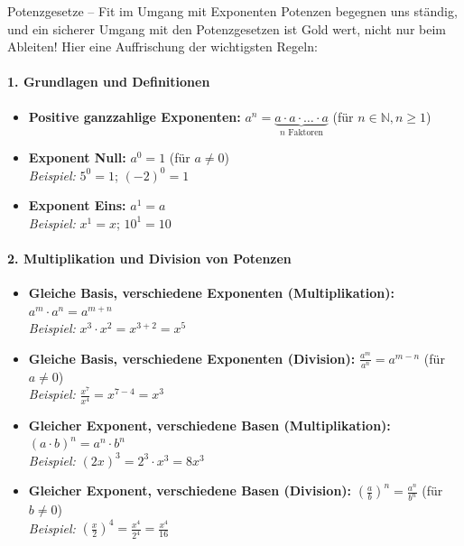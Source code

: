 \begin{erinnerungsboxumgebung}{Potenzgesetze – Fit im Umgang mit Exponenten}
Potenzen begegnen uns ständig, und ein sicherer Umgang mit den Potenzgesetzen ist Gold wert, nicht nur beim Ableiten! Hier eine Auffrischung der wichtigsten Regeln:

\paragraph{1. Grundlagen und Definitionen}
\begin{itemize}[nosep, leftmargin=2em]
    \item \textbf{Positive ganzzahlige Exponenten:} $a^n = \underbrace{a \cdot a \cdot \dots \cdot a}_{n \text{ Faktoren}}$ (für $n \in \mathbb{N}, n \ge 1$)
    \item \textbf{Exponent Null:} $a^0 = 1$ (für $a \neq 0$) \\ \textit{Beispiel:} $5^0 = 1$; $(-2)^0 = 1$
    \item \textbf{Exponent Eins:} $a^1 = a$ \\ \textit{Beispiel:} $x^1 = x$; $10^1 = 10$
\end{itemize}

\paragraph{2. Multiplikation und Division von Potenzen}
\begin{itemize}[nosep, leftmargin=2em]
    \item \textbf{Gleiche Basis, verschiedene Exponenten (Multiplikation):} $a^m \cdot a^n = a^{m+n}$ \\ \textit{Beispiel:} $x^3 \cdot x^2 = x^{3+2} = x^5$
    \item \textbf{Gleiche Basis, verschiedene Exponenten (Division):} $\frac{a^m}{a^n} = a^{m-n}$ (für $a \neq 0$) \\ \textit{Beispiel:} $\frac{x^7}{x^4} = x^{7-4} = x^3$
    \item \textbf{Gleicher Exponent, verschiedene Basen (Multiplikation):} $(a \cdot b)^n = a^n \cdot b^n$ \\ \textit{Beispiel:} $(2x)^3 = 2^3 \cdot x^3 = 8x^3$
    \item \textbf{Gleicher Exponent, verschiedene Basen (Division):} $\left(\frac{a}{b}\right)^n = \frac{a^n}{b^n}$ (für $b \neq 0$) \\ \textit{Beispiel:} $\left(\frac{x}{2}\right)^4 = \frac{x^4}{2^4} = \frac{x^4}{16}$
\end{itemize}


\end{erinnerungsboxumgebung}
